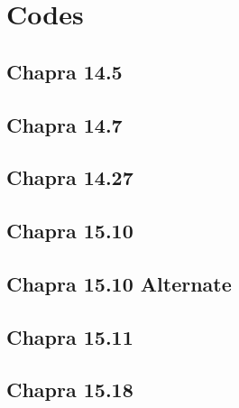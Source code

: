 \documentclass{article}
\begin{document}
\pagebreak
\appendix
\section{Codes}
\lstset{style=python103, language=python} 

\subsection{Chapra 14.5}

\pagebreak

%

\subsection{Chapra 14.7}

\pagebreak

\subsection{Chapra 14.27}

\pagebreak

\subsection{Chapra 15.10}

\pagebreak

\subsection{Chapra 15.10 Alternate}

\pagebreak

\subsection{Chapra 15.11}

\pagebreak

\subsection{Chapra 15.18}

\pagebreak
\end{document}

